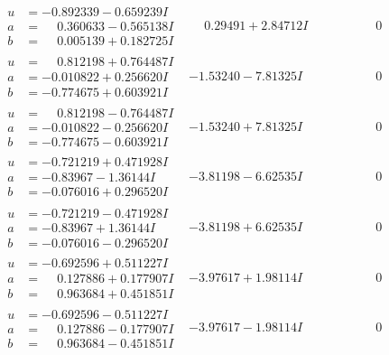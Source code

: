 \documentclass[1p]{elsarticle_modified}
\theoremstyle{definition}
\begin{document}
$$\begin{array}{c|c|c}
\begin{aligned}
u &= -0.892339 - 0.659239 I \\
a &= \phantom{-}0.360633 - 0.565138 I \\
b &= \phantom{-}0.005139 + 0.182725 I\end{aligned}
 & \phantom{-}0.29491 + 2.84712 I & \phantom{-0.000000 } 0 \\ \hline\begin{aligned}
u &= \phantom{-}0.812198 + 0.764487 I \\
a &= -0.010822 + 0.256620 I \\
b &= -0.774675 + 0.603921 I\end{aligned}
 & -1.53240 - 7.81325 I & \phantom{-0.000000 } 0 \\ \hline\begin{aligned}
u &= \phantom{-}0.812198 - 0.764487 I \\
a &= -0.010822 - 0.256620 I \\
b &= -0.774675 - 0.603921 I\end{aligned}
 & -1.53240 + 7.81325 I & \phantom{-0.000000 } 0 \\ \hline\begin{aligned}
u &= -0.721219 + 0.471928 I \\
a &= -0.83967 - 1.36144 I \\
b &= -0.076016 + 0.296520 I\end{aligned}
 & -3.81198 - 6.62535 I & \phantom{-0.000000 } 0 \\ \hline\begin{aligned}
u &= -0.721219 - 0.471928 I \\
a &= -0.83967 + 1.36144 I \\
b &= -0.076016 - 0.296520 I\end{aligned}
 & -3.81198 + 6.62535 I & \phantom{-0.000000 } 0 \\ \hline\begin{aligned}
u &= -0.692596 + 0.511227 I \\
a &= \phantom{-}0.127886 + 0.177907 I \\
b &= \phantom{-}0.963684 + 0.451851 I\end{aligned}
 & -3.97617 + 1.98114 I & \phantom{-0.000000 } 0 \\ \hline\begin{aligned}
u &= -0.692596 - 0.511227 I \\
a &= \phantom{-}0.127886 - 0.177907 I \\
b &= \phantom{-}0.963684 - 0.451851 I\end{aligned}
 & -3.97617 - 1.98114 I & \phantom{-0.000000 } 0 \\ \hline\begin{aligned}

\end{aligned}
\end{array}$$
\end{document}
